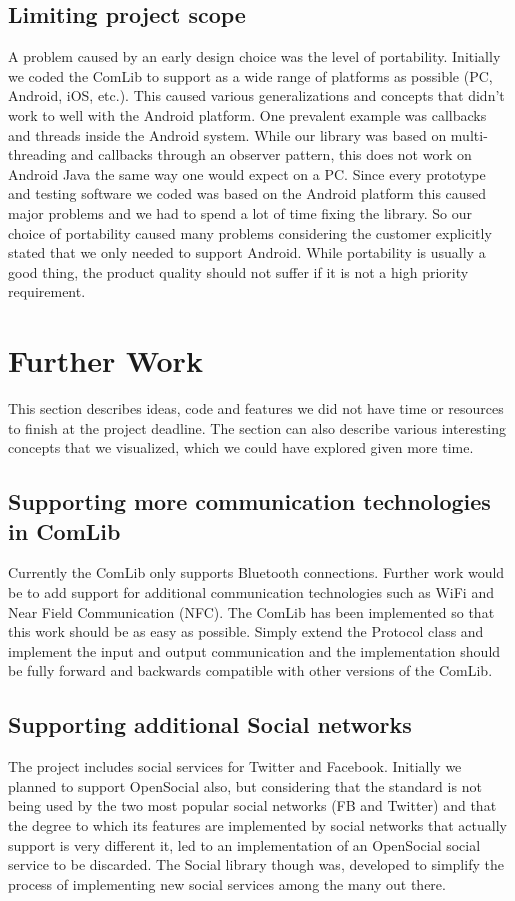\subsection{Limiting project scope}
A problem caused by an early design choice was the level of portability.
Initially we coded the ComLib to support as a wide range of platforms as possible (PC, Android, iOS, etc.).
This caused various generalizations and concepts that didn't work to well with the Android platform.
One prevalent example was callbacks and threads inside the Android system.
While our library was based on multi-threading and callbacks through an observer pattern,
this does not work on Android Java the same way one would expect on a PC.
Since every prototype and testing software we coded was based on the Android platform
this caused major problems and we had to spend a lot of time fixing the library.
So our choice of portability caused many problems considering the customer explicitly
stated that we only needed to support Android. While portability is usually a good thing,
the product quality should not suffer if it is not a high priority requirement.

\section{Further Work}
This section describes ideas, code and features we did not have time or resources to
finish at the project deadline. The section can also describe various interesting concepts 
that we visualized, which we could have explored given more time.

\subsection{Supporting more communication technologies in ComLib}
Currently the ComLib only supports Bluetooth connections. Further work would be
to add support for additional communication technologies such as WiFi and Near Field 
Communication (NFC). The ComLib has been implemented so that this work should
be as easy as possible. Simply extend the Protocol class and implement the input and
output communication and the implementation should be fully forward and backwards
compatible with other versions of the ComLib.

\subsection{Supporting additional Social networks}
The project includes social services for Twitter and Facebook. Initially we planned
to support OpenSocial also, but considering that the standard is not being used by the two
most popular social networks (FB and Twitter) and that the degree to which its features
are implemented by social networks that actually support is very different it,
led to an implementation of an OpenSocial social service to be discarded.
The Social library though was, developed to simplify the process of implementing
new social services among the many out there.

